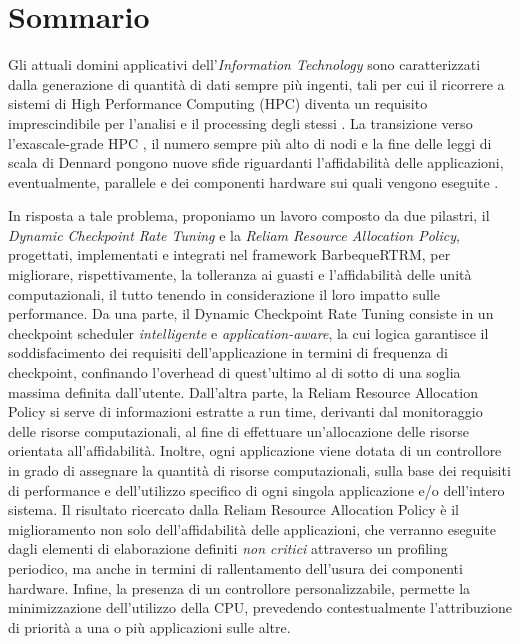 %
\cleardoublepage
{}
{}
%
%
\chapter*{Sommario}
%
%

Gli attuali domini applicativi dell'\emph{Information Technology} sono caratterizzati dalla generazione di quantità di dati sempre più ingenti, tali per cui il ricorrere a sistemi di High Performance Computing (HPC) diventa un requisito imprescindibile per l'analisi e il processing degli stessi \cite{marqube_2020}. La transizione verso l'exascale-grade HPC \cite{10.1145/3372390}, il numero sempre più alto di nodi e la fine delle leggi di scala di Dennard pongono nuove sfide riguardanti l'affidabilità delle applicazioni, eventualmente, parallele e dei componenti hardware sui quali vengono eseguite \cite{4629245}.

In risposta a tale problema, proponiamo un lavoro composto da due pilastri, il \emph{Dynamic Checkpoint Rate Tuning} e la \emph{Reliam Resource Allocation Policy}, progettati, implementati e integrati nel framework BarbequeRTRM, per migliorare, rispettivamente, la tolleranza ai guasti e l'affidabilità delle unità computazionali, il tutto tenendo in considerazione il loro impatto sulle performance. Da una parte, il Dynamic Checkpoint Rate Tuning consiste in un checkpoint scheduler \emph{intelligente} e \emph{application-aware}, la cui logica garantisce il soddisfacimento dei requisiti dell'applicazione in termini di frequenza di checkpoint, confinando l'overhead di quest'ultimo al di sotto di una soglia massima definita dall'utente. Dall'altra parte, la Reliam Resource Allocation Policy si serve di informazioni estratte a run time, derivanti dal monitoraggio delle risorse computazionali, al fine di effettuare un'allocazione delle risorse orientata all'affidabilità. Inoltre, ogni applicazione viene dotata di un controllore in grado di assegnare la  quantità di risorse computazionali, sulla base dei requisiti di performance e dell'utilizzo specifico di ogni singola applicazione e/o dell'intero sistema. Il risultato ricercato dalla Reliam Resource Allocation Policy è il miglioramento non solo dell'affidabilità delle applicazioni, che verranno eseguite dagli elementi di elaborazione definiti \emph{non critici} attraverso un profiling periodico, ma anche in termini di rallentamento dell'usura dei componenti hardware. Infine, la presenza di un controllore personalizzabile, permette la minimizzazione dell'utilizzo della CPU, prevedendo contestualmente l'attribuzione di priorità a una o più applicazioni sulle altre.


%
